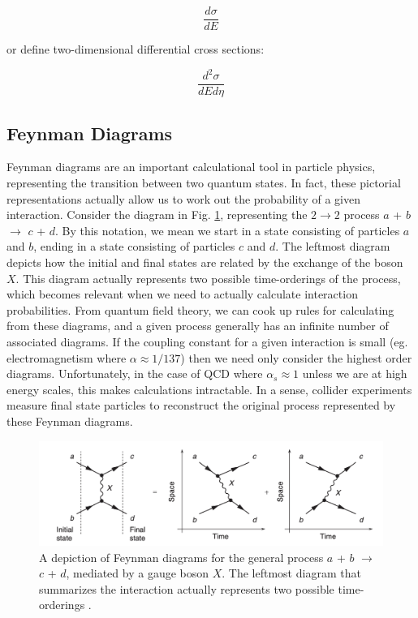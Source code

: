 \documentclass[../main.tex]{subfiles}
\begin{document}
\begin{equation}
    \frac{d\sigma}{dE}    
\end{equation}

or define two-dimensional differential cross sections:

\begin{equation}
    \frac{d^2\sigma}{dE d\eta}
\end{equation}

\subsection{Feynman Diagrams}
Feynman diagrams are an important calculational tool in particle physics, representing the transition between two quantum states. In fact, these pictorial representations actually allow us to work out the probability of a given interaction. Consider the diagram in Fig. \ref{fig:twotwo}, representing the $2\rightarrow2$ process $a$ + $b$ $\rightarrow$ $c$ + $d$. By this notation, we mean we start in a state consisting of particles $a$ and $b$, ending in a state consisting of particles $c$ and $d$. The leftmost diagram depicts how the initial and final states are related by the exchange of the boson $X$. This diagram actually represents two possible time-orderings of the process, which becomes relevant when we need to actually calculate interaction probabilities. From quantum field theory, we can cook up rules for calculating from these diagrams, and a given process generally has an infinite number of associated diagrams. If the coupling constant for a given interaction is small (eg. electromagnetism where $\alpha \approx 1/137$) then we need only consider the highest order diagrams. Unfortunately, in the case of QCD where $\alpha_s \approx 1$ unless we are at high energy scales, this makes calculations intractable. In a sense, collider experiments measure final state particles to reconstruct the original process represented by these Feynman diagrams.  

\begin{figure}[h]
    \centering
    \includegraphics[scale=0.3]{introduction/figs/twotwo.png}
    \caption{A depiction of Feynman diagrams for the general process $a$ + $b$ $\rightarrow$ $c$ + $d$, mediated by a gauge boson $X$. The leftmost diagram that summarizes the interaction actually represents two possible time-orderings \cite{Thomson:particle}.}
    \label{fig:twotwo}
\end{figure}
\end{document}
